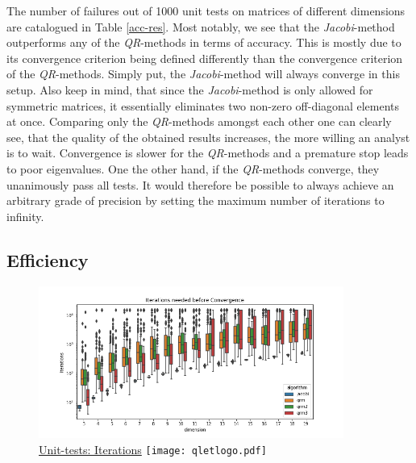 \documentclass[12pt]{article}
\begin{document}
The number of failures out of 1000 unit tests on matrices of different dimensions are catalogued in Table \ref{acc-res}. Most notably, we see that the \textit{Jacobi}-method outperforms any of the \textit{QR}-methods in terms of accuracy. This is mostly due to its convergence criterion being defined differently than the convergence criterion of the \textit{QR}-methods. Simply put, the \textit{Jacobi}-method will always converge in this setup. Also keep in mind, that since the \textit{Jacobi}-method is only allowed for symmetric matrices, it essentially eliminates two non-zero off-diagonal elements at once. Comparing only the \textit{QR}-methods amongst each other one can clearly see, that the quality of the obtained results increases, the more willing an analyst is to wait. Convergence is slower for the \textit{QR}-methods and a premature stop leads to poor eigenvalues. One the other hand, if the \textit{QR}-methods converge, they unanimously pass all tests. It would therefore be possible to always achieve an arbitrary grade of precision by setting the maximum number of iterations to infinity.

\subsection{Efficiency}


\begin{figure}
\centering
\caption{\href {https://github.com/thsis/NIS18/blob/master/tests/tests_eigen.py}{Unit-tests: Iterations}  \protect\texttt{[image: qletlogo.pdf]}}
  \label{algo_efficiency}
  \includegraphics[width=\textwidth, height=5cm]{../media/plots/iterations_boxplot.png}
\end{figure}
\end{document}

